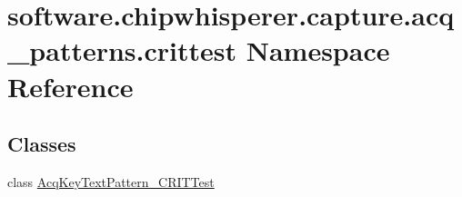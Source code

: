 \hypertarget{namespacesoftware_1_1chipwhisperer_1_1capture_1_1acq__patterns_1_1crittest}{}\section{software.\+chipwhisperer.\+capture.\+acq\+\_\+patterns.\+crittest Namespace Reference}
\label{namespacesoftware_1_1chipwhisperer_1_1capture_1_1acq__patterns_1_1crittest}
\subsection*{Classes}
\begin{DoxyCompactItemize}
\item 
class \hyperlink{classsoftware_1_1chipwhisperer_1_1capture_1_1acq__patterns_1_1crittest_1_1AcqKeyTextPattern__CRITTest}{Acq\+Key\+Text\+Pattern\+\_\+\+C\+R\+I\+T\+Test}
\end{DoxyCompactItemize}
